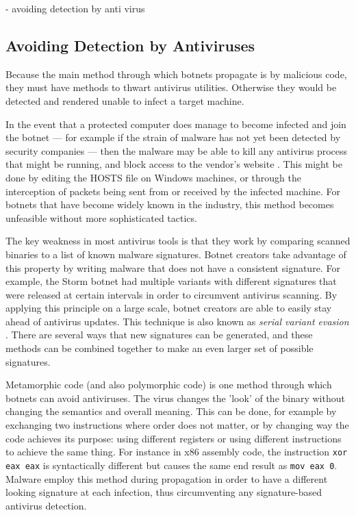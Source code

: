 \documentclass{acm_proc_article-sp}
\begin{document}
    - avoiding detection by anti virus
\subsection{Avoiding Detection by Antiviruses}
Because the main method through which botnets propagate is by malicious code, they must have methods to thwart antivirus utilities. Otherwise they would be detected and rendered unable to infect a target machine. 

In the event that a protected computer does manage to become infected and join the botnet --- for example if the strain of malware has not yet been detected by security companies --- then the malware may be able to kill any antivirus process that might be running, and block access to the vendor's website \cite{barford:book}. This might be done by editing the HOSTS file on Windows machines, or through the interception of packets being sent from or received by the infected machine. For botnets that have become widely known in the industry, this method becomes unfeasible without more sophisticated tactics.

The key weakness in most antivirus tools is that they work by comparing scanned binaries to a list of known malware signatures. Botnet creators take advantage of this property by writing malware that does not have a consistent signature. For example, the Storm botnet had multiple variants with different signatures that were released at certain intervals in order to circumvent antivirus scanning. By applying this principle on a large scale, botnet creators are able to easily stay ahead of antivirus updates. This technique is also known as \emph{serial variant evasion} \cite{ollmann:evasion}. There are several ways that new signatures can be generated, and these methods can be combined together to make an even larger set of possible signatures.

Metamorphic code (and also polymorphic code) is one method through which botnets can avoid antiviruses. The virus changes the 'look' of the binary without changing the semantics and overall meaning. This can be done, for example by exchanging two instructions where order does not matter, or by changing way the code achieves its purpose: using different registers or using different instructions to achieve the same thing. For instance in x86 assembly code, the instruction \texttt{xor eax eax} is syntactically different but causes the same end result as \texttt{mov eax 0}. Malware employ this method during propagation in order to have a different looking signature at each infection, thus circumventing any signature-based antivirus detection.
\end{document}
